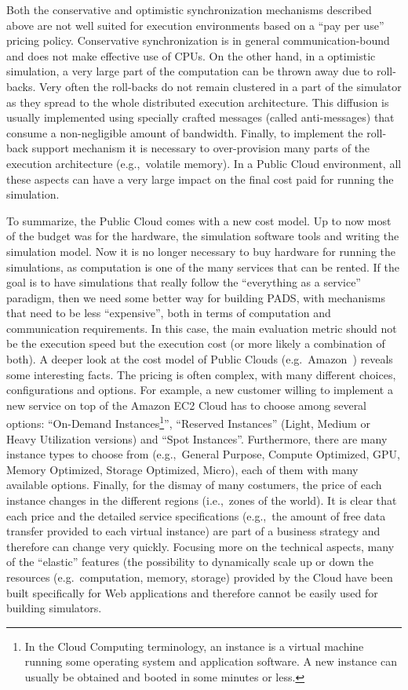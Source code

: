 \documentclass[1p]{elsarticle}
\begin{document}
Both the conservative and optimistic synchronization mechanisms
described above are not well suited for execution environments based on
a ``pay per use'' pricing policy. Conservative synchronization is in
general communication-bound and does not make effective use of CPUs.
On the other hand, in a optimistic simulation, a very large part of
the computation can be thrown away due to roll-backs. Very often the
roll-backs do not remain clustered in a part of the simulator as they
spread to the whole distributed execution architecture. This diffusion
is usually implemented using specially crafted messages (called
anti-messages) that consume a non-negligible amount of
bandwidth. Finally, to implement the roll-back support mechanism it is
necessary to over-provision many parts of the execution architecture
(e.g.,~volatile memory). In a Public Cloud environment, all these
aspects can have a very large impact on the final cost paid for
running the simulation.

To summarize, the Public Cloud comes with a new cost model.  Up to
now most of the budget was for the hardware, the simulation software
tools and writing the simulation model. Now it is no longer necessary
to buy hardware for running the simulations, as computation is one of
the many services that can be rented.  If the goal is to have
simulations that really follow the ``everything as a service''
paradigm, then we need some better way for building PADS, with
mechanisms that need to be less ``expensive'', both in terms of
computation and communication requirements. In this case, the main
evaluation metric should not be the execution speed but the execution cost
(or more likely a combination of both).
A deeper look at the cost model of Public Clouds
(e.g.~Amazon~\cite{amazonEC2pricing}) reveals some interesting
facts. The pricing is often complex, with many
different choices, configurations and options. For example, a new
customer willing to implement a new service on top of the Amazon EC2
Cloud has to choose among several options: ``On-Demand
Instances\footnote{In the Cloud Computing terminology, an instance is
a virtual machine running some operating system and application
software. A new instance can usually be obtained and booted in some
minutes or less.}'', ``Reserved Instances'' (Light, Medium or Heavy
Utilization versions) and ``Spot Instances''. Furthermore, there are
many instance types to choose from (e.g.,~General Purpose, Compute
Optimized, GPU, Memory Optimized, Storage Optimized, Micro), each of
them with many available options. Finally, for the dismay of many
costumers, the price of each instance changes in the different regions
(i.e.,~zones of the world). It is clear that each price and the
detailed service specifications (e.g.,~the amount of free data
transfer provided to each virtual instance) are part of a business
strategy and therefore can change very quickly. Focusing more on the
technical aspects, many of the ``elastic'' features (the possibility
to dynamically scale up or down the resources (e.g.~computation,
memory, storage) provided by the Cloud have been built specifically
for Web applications and therefore cannot be easily used for building
simulators.
\end{document}
